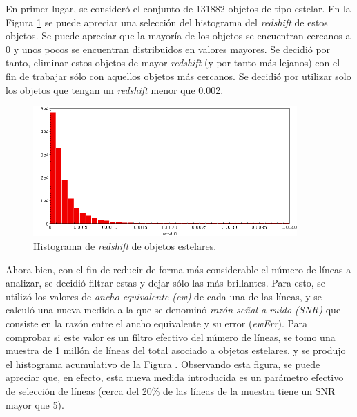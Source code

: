 En primer lugar, se consideró el conjunto de 131882 objetos de tipo estelar. En la Figura \ref{fig:stelar_obj_redshift} se puede apreciar una selección del histograma del \textit{redshift} de estos objetos. Se puede apreciar que la mayoría de los objetos se encuentran cercanos a 0 y unos pocos se encuentran distribuidos en valores mayores. Se decidió por tanto, eliminar estos objetos de mayor \textit{redshift} (y por tanto más lejanos) con el fin de trabajar sólo con aquellos objetos más cercanos. Se decidió por utilizar solo los objetos que tengan un \textit{redshift} menor que 0.002.

\begin{figure}[h!]
\begin{center}
\includegraphics[width=0.9\textwidth]{imagenes/stelar_obj_redshift_hist.png}
\end{center}
\vspace*{-5mm}
\caption{Histograma de \textit{redshift} de objetos estelares.}
\label{fig:stelar_obj_redshift}
\end{figure}

Ahora bien, con el fin de reducir de forma más considerable el número de líneas a analizar, se decidió filtrar estas y dejar sólo las más brillantes. Para esto, se utilizó los valores de \textit{ancho equivalente (ew)} de cada una de las líneas, y se calculó una nueva medida a la que se denominó \textit{razón señal a ruido (SNR)} que consiste en la razón entre el ancho equivalente y su error (\textit{ewErr}). Para comprobar si este valor es un filtro efectivo del número de líneas, se tomo una muestra de 1 millón de líneas del total asociado a objetos estelares, y se produjo el histograma acumulativo de la Figura \label{fig:stelar_obj_snr}. Observando esta figura, se puede apreciar que, en efecto, esta nueva medida introducida es un parámetro efectivo de selección de líneas (cerca del 20\% de las líneas de la muestra tiene un SNR mayor que 5).

